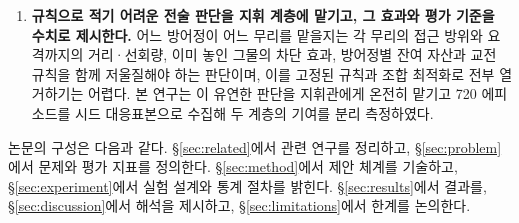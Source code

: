 \begin{enumerate}[leftmargin=*, itemsep=3pt, topsep=4pt]
      이득의 차이를 만들고, 학습된 비평가로 가치를 추정하지 않으므로 가치 추정 편향과
      비평가 학습의 불안정성이 설계에서 사라진다. 이 기준선은 정책을 휴리스틱 근방에
      붙잡는 신뢰 영역 구실도 하여, 무작위 초기화에서 흔한 초기 붕괴 없이 휴리스틱
      천장을 넘어서게 한다. 한 척의 행동만 바꾸어 재평가하는 반사실적 변형도 구현하여
      비교하였다.
\item \textbf{규칙으로 적기 어려운 전술 판단을 지휘 계층에 맡기고, 그 효과와 평가 기준을
      수치로 제시한다.} 어느 방어정이 어느 무리를 맡을지는 각 무리의 접근 방위와
      요격까지의 거리·선회량, 이미 놓인 그물의 차단 효과, 방어정별 잔여 자산과 교전
      규칙을 함께 저울질해야 하는 판단이며, 이를 고정된 규칙과 조합 최적화로 전부
      열거하기는 어렵다. 본 연구는 이 유연한 판단을 지휘관에게 온전히
      맡기고 720 에피소드를 시드 대응표본으로 수집해 두 계층의 기여를 분리 측정하였다.
\end{enumerate}

\noindent
논문의 구성은 다음과 같다. \S\ref{sec:related}에서 관련 연구를 정리하고,
\S\ref{sec:problem}에서 문제와 평가 지표를 정의한다. \S\ref{sec:method}에서 제안 체계를
기술하고, \S\ref{sec:experiment}에서 실험 설계와 통계 절차를 밝힌다.
\S\ref{sec:results}에서 결과를, \S\ref{sec:discussion}에서 해석을 제시하고,
\S\ref{sec:limitations}에서 한계를 논의한다.
